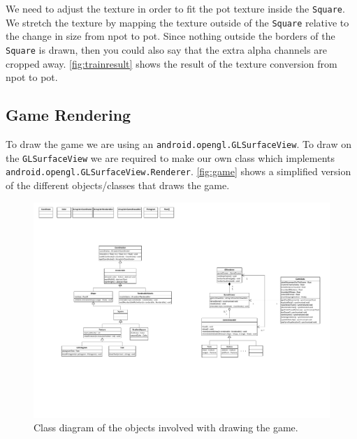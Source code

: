 We need to adjust the texture in order to fit the \ac{pot} texture inside the \lstinline|Square|. We stretch the texture by mapping the texture outside of the \lstinline|Square| relative to the change in size from \ac{npot} to \ac{pot}. Since nothing outside the borders of the \lstinline|Square| is drawn, then you could also say that the extra alpha channels are cropped away. \autoref{fig:trainresult} shows the result of the texture conversion from \ac{npot} to \ac{pot}.

\subsection{Game Rendering}\label{sec:gamerendering}

To draw the game we are using an \lstinline|android.opengl.GLSurfaceView|. To draw on the \lstinline|GLSurfaceView| we are required to make our own class which implements \lstinline|android.opengl.GLSurfaceView.Renderer|. \autoref{fig:game} shows a simplified version of the different objects/classes that draws the game.
\begin{figure}[H]
\centering
\includegraphics[page=3,width=1\linewidth]{img/opengl.pdf}
\caption{Class diagram of the objects involved with drawing the game.}
\label{fig:game}
\end{figure}

